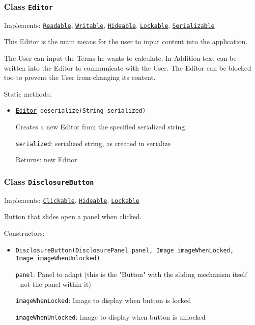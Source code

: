 \subsubsection{Class \texttt{Editor}}
\label{type:edu.kit.wavelength.client.view.webui.component.Editor}
Implements: \texttt{\hyperref[type:edu.kit.wavelength.client.view.api.Readable]{Readable}}, \texttt{\hyperref[type:edu.kit.wavelength.client.view.api.Writable]{Writable}}, \texttt{\hyperref[type:edu.kit.wavelength.client.view.api.Hideable]{Hideable}}, \texttt{\hyperref[type:edu.kit.wavelength.client.view.api.Lockable]{Lockable}}, \texttt{\hyperref[type:edu.kit.wavelength.client.model.serialization.Serializable]{Serializable}}

This Editor is the main means for the user to input content into the
 application.
 
 The User can input the Terms he wants to calculate. In Addition text can be
 written into the Editor to communicate with the User. The Editor can be
 blocked too to prevent the User from changing its content.

Static methods:
\begin{itemize}
\item \texttt{\hyperref[type:edu.kit.wavelength.client.view.webui.component.Editor]{Editor} deserialize(String serialized)}

Creates a new Editor from the specified serialized string.

\texttt{serialized}: serialized string, as created in serialize

Returns: new Editor

\end{itemize}

\subsubsection{Class \texttt{DisclosureButton}}
\label{type:edu.kit.wavelength.client.view.webui.component.DisclosureButton}
Implements: \texttt{\hyperref[type:edu.kit.wavelength.client.view.api.Clickable]{Clickable}}, \texttt{\hyperref[type:edu.kit.wavelength.client.view.api.Hideable]{Hideable}}, \texttt{\hyperref[type:edu.kit.wavelength.client.view.api.Lockable]{Lockable}}

Button that slides open a panel when clicked.

Constructors:
\begin{itemize}
\item \texttt{DisclosureButton(DisclosurePanel panel, Image imageWhenLocked, Image imageWhenUnlocked)}



\texttt{panel}: Panel to adapt (this is the "Button" with the sliding mechanism itself - not the panel within it)

\texttt{imageWhenLocked}: Image to display when button is locked

\texttt{imageWhenUnlocked}: Image to display when button is unlocked

\end{itemize}

